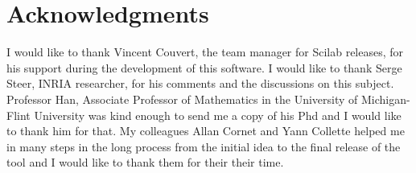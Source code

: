 \chapter{Acknowledgments}

I would like to thank Vincent Couvert, 
the team manager for Scilab releases, for his support 
during the development of this software. I would like to thank 
Serge Steer, INRIA researcher, for his comments and the discussions 
on this subject. Professor Han, Associate Professor of Mathematics in the 
University of Michigan-Flint University was kind enough to send me a copy
of his Phd and I would like to thank him for that.
My colleagues Allan Cornet and Yann Collette helped me in many 
steps in the long process from the initial idea to the final 
release of the tool and I would like to thank them for their
their time.

